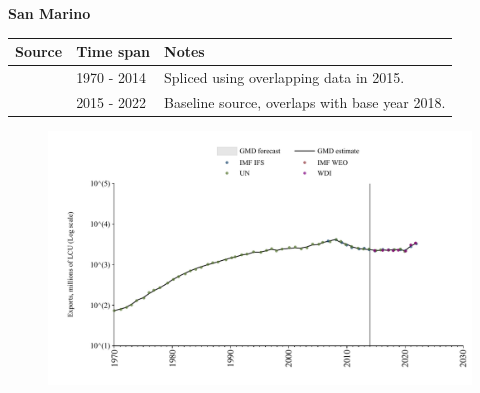 \documentclass[12pt,a4paper,landscape]{article}
\begin{document}
\begin{adjustbox}{max totalsize={\paperwidth}{\paperheight},center}
\begin{minipage}[t][\textheight][t]{\textwidth}
\vspace*{0.5cm}
{}
\begin{center}
{\Large\bfseries San Marino}
\end{center}
\vspace{0.5cm}
\begin{table}[H]
\centering
\small
\begin{tabular}{|l|l|l|}
\hline
\textbf{Source} & \textbf{Time span} & \textbf{Notes} \\
\hline
\rowcolor{white}\cite{UN}& 1970 - 2014 &Spliced using overlapping data in 2015.\\
\rowcolor{lightgray}\cite{WDI}& 2015 - 2022 &Baseline source, overlaps with base year 2018.\\
\hline
\end{tabular}
\end{table}
\begin{figure}[H]
\centering
\includegraphics[width=\textwidth,height=0.6\textheight,keepaspectratio]{graphs/SMR_exports.pdf}
\end{figure}
\end{minipage}
\end{adjustbox}
\end{document}
